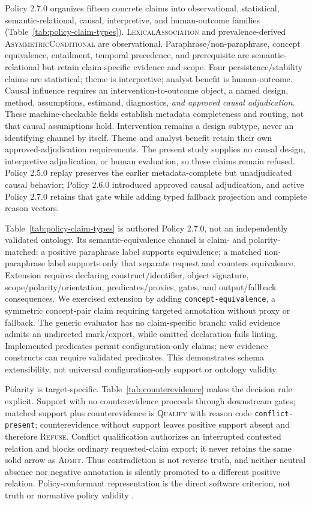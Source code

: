 \documentclass[manuscript,screen,review]{acmart}
\begin{document}
Policy 2.7.0 organizes fifteen concrete claims into observational, statistical, semantic-relational, causal, interpretive, and human-outcome families (Table~\ref{tab:policy-claim-types}). \textsc{LexicalAssociation} and prevalence-derived \textsc{AsymmetricConditional} are observational. Paraphrase/non-paraphrase, concept equivalence, entailment, temporal precedence, and prerequisite are semantic-relational but retain claim-specific evidence and scope. Four persistence/stability claims are statistical; theme is interpretive; analyst benefit is human-outcome. Causal influence requires an intervention-to-outcome object, a named design, method, assumptions, estimand, diagnostics, \emph{and approved causal adjudication}. These machine-checkable fields establish metadata completeness and routing, not that causal assumptions hold. Intervention remains a design subtype, never an identifying channel by itself. Theme and analyst benefit retain their own approved-adjudication requirements. The present study supplies no causal design, interpretive adjudication, or human evaluation, so these claims remain refused. Policy 2.5.0 replay preserves the earlier metadata-complete but unadjudicated causal behavior; Policy 2.6.0 introduced approved causal adjudication, and active Policy 2.7.0 retains that gate while adding typed fallback projection and complete reason vectors.



Table~\ref{tab:policy-claim-types} is authored Policy 2.7.0, not an independently validated ontology. Its semantic-equivalence channel is claim- and polarity-matched: a positive paraphrase label supports equivalence; a matched non-paraphrase label supports only that separate request and counters equivalence. Extension requires declaring construct/identifier, object signature, scope/polarity/orientation, predicates/proxies, gates, and output/fallback consequences. We exercised extension by adding \texttt{concept-equivalence}, a symmetric concept-pair claim requiring targeted annotation without proxy or fallback. The generic evaluator has no claim-specific branch: valid evidence admits an undirected mark/export, while omitted declaration fails linting. Implemented predicates permit configuration-only claims; new evidence constructs can require validated predicates. This demonstrates schema extensibility, not universal configuration-only support or ontology validity.

Polarity is target-specific. Table~\ref{tab:counterevidence} makes the decision rule explicit. Support with no counterevidence proceeds through downstream gates; matched support plus counterevidence is \textsc{Qualify} with reason code \texttt{conflict-present}; counterevidence without support leaves positive support absent and therefore \textsc{Refuse}. Conflict qualification authorizes an interrupted contested relation and blocks ordinary requested-claim export; it never retains the same solid arrow as \textsc{Admit}. Thus contradiction is not reverse truth, and neither neutral absence nor negative annotation is silently promoted to a different positive relation. Policy-conformant representation is the direct software criterion, not truth or normative policy validity \cite{bolinska2016}.
\end{document}
